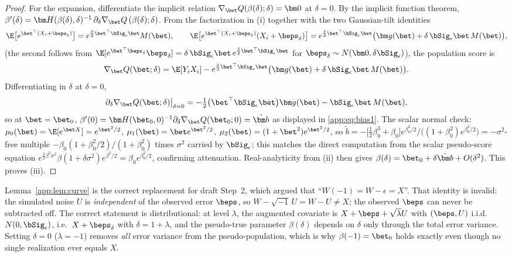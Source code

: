 \begin{proof}
For the expansion, differentiate the implicit relation
$\nabla_{\bet} Q(\beta(\delta);\delta)=\bm 0$ at $\delta=0$. By the implicit
function theorem, $\beta'(\delta)=\bm H(\beta(\delta),\delta)^{-1}\,
\partial_\delta\nabla_{\bet} Q\,(\beta(\delta);\delta)$. From the
factorization in (i) together with the two Gaussian-tilt identities
\[
  \E\bigl[e^{\bet^\top(X_i+\beps_\delta)}\bigr]
  =e^{\frac{\delta}{2}\bet^\top\bSig_\epsilon\bet}M(\bet),
  \qquad
  \E\bigl[e^{\bet^\top(X_i+\beps_\delta)}(X_i+\beps_\delta)\bigr]
  =e^{\frac{\delta}{2}\bet^\top\bSig_\epsilon\bet}
   \bigl(\bm g(\bet)+\delta\,\bSig_\epsilon\bet\,M(\bet)\bigr),
\]
(the second follows from
$\E[e^{\bet^\top\beps_\delta}\beps_\delta]
=\delta\,\bSig_\epsilon\bet\,e^{\frac{\delta}{2}\bet^\top\bSig_\epsilon\bet}$
for $\beps_\delta\sim N(\bm 0,\delta\bSig_\epsilon)$), the population score
is
\[
  \nabla_{\bet} Q(\bet;\delta)=\E[Y_iX_i]
  -e^{\frac{\delta}{2}\bet^\top\bSig_\epsilon\bet}
  \bigl(\bm g(\bet)+\delta\,\bSig_\epsilon\bet\,M(\bet)\bigr).
\]
Differentiating in $\delta$ at $\delta=0$,
\[
  \partial_\delta\nabla_{\bet} Q(\bet;\delta)\big|_{\delta=0}
  =-\tfrac12\bigl(\bet^\top\bSig_\epsilon\bet\bigr)\bm g(\bet)
   -\bSig_\epsilon\bet\,M(\bet),
\]
so at $\bet=\bet_0$,
$\beta'(0)=\bm H(\bet_0,0)^{-1}\partial_\delta\nabla_{\bet} Q(\bet_0;0)
=\tilde{\bm b}$ as displayed in \eqref{app:eq:bias1}. The scalar normal check:
$\mu_0(\bet)=\E[e^{\bet X}]=e^{\bet^2/2}$,
$\mu_1(\bet)=\bet e^{\bet^2/2}$,
$\mu_2(\bet)=(1+\bet^2)e^{\bet^2/2}$, so
$\tilde b=-\bigl[\tfrac12\beta_0^3+\beta_0\bigr]e^{\beta_0^2/2}
/\bigl((1+\beta_0^2)e^{\beta_0^2/2}\bigr)
=-\sigma^2$-free multiple $-\beta_0(1+\beta_0^2/2)/(1+\beta_0^2)$
times $\sigma^2$ carried by $\bSig_\epsilon$; this matches the direct
computation from the scalar pseudo-score equation
$e^{\frac{\delta}{2}\beta^2\sigma^2}\beta(1+\delta\sigma^2)e^{\beta^2/2}
=\beta_0e^{\beta_0^2/2}$, confirming attenuation. Real-analyticity from
(ii) then gives $\beta(\delta)=\bet_0+\delta\tilde{\bm b}+O(\delta^2)$.
This proves (iii).
\end{proof}

\begin{remark}
Lemma~\ref{app:lem:curve} is the correct replacement for draft Step~2, which
argued that ``$W(-1)=W-\epsilon=X$''. That identity is invalid: the
simulated noise $U$ is \emph{independent} of the observed error $\beps$,
so $W-\sqrt{-1}\,U=W-U\neq X$; the observed $\beps$ can never be
subtracted off. The correct statement is distributional: at level
$\lambda$, the augmented covariate is $X+\beps+\sqrt\lambda U$ with
$(\beps,U)$ i.i.d.\ $N(0,\bSig_\epsilon)$, i.e.\ $X+\beps_\delta$ with
$\delta=1+\lambda$, and the pseudo-true parameter $\beta(\delta)$ depends
on $\delta$ only through the total error variance. Setting $\delta=0$
($\lambda=-1$) removes \emph{all} error variance from the pseudo-population,
which is why $\beta(-1)=\bet_0$ holds exactly even though no single
realization ever equals $X$.
\end{remark}

